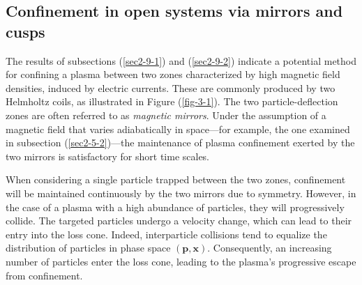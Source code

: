 \subsection{Confinement in open systems via mirrors and cusps}

The results of subsections (\ref{sec2-9-1}) and (\ref{sec2-9-2}) indicate a potential method for confining a plasma between two zones characterized by high magnetic field densities, induced by electric currents. These are commonly produced by two Helmholtz coils, as illustrated in Figure (\ref{fig-3-1}). The two particle-deflection zones are often referred to as \textit{magnetic mirrors}. Under the assumption of a magnetic field that varies adiabatically in space—for example, the one examined in subsection (\ref{sec2-5-2})—the maintenance of plasma confinement exerted by the two mirrors is satisfactory for short time scales.

\quad When considering a single particle trapped between the two zones, confinement will be maintained continuously by the two mirrors due to symmetry. However, in the case of a plasma with a high abundance of particles, they will progressively collide. The targeted particles undergo a velocity change, which can lead to their entry into the loss cone. Indeed, interparticle collisions tend to equalize the distribution of particles in phase space $(\mathbf{p}, \mathbf{x})$. Consequently, an increasing number of particles enter the loss cone, leading to the plasma's progressive escape from confinement.

